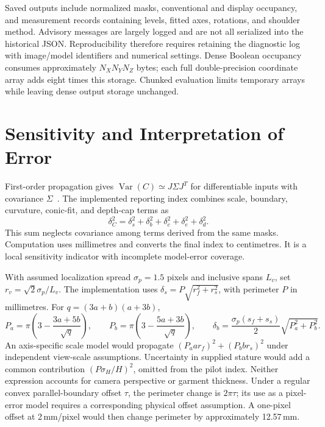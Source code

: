\documentclass[11pt,a4paper]{article}
\begin{document}
Saved outputs include normalized masks, conventional and display occupancy, and measurement records containing levels, fitted axes, rotations, and shoulder method. Advisory messages are largely logged and are not all serialized into the historical JSON. Reproducibility therefore requires retaining the diagnostic log with image/model identifiers and numerical settings. Dense Boolean occupancy consumes approximately $N_XN_YN_Z$ bytes; each full double-precision coordinate array adds eight times this storage. Chunked evaluation limits temporary arrays while leaving dense output storage unchanged.

\section{Sensitivity and Interpretation of Error}
First-order propagation gives $\operatorname{Var}(C)\simeq J\Sigma J^T$ for differentiable inputs with covariance $\Sigma$~\cite{jcgm2008}. The implemented reporting index combines scale, boundary, curvature, conic-fit, and depth-cap terms as
\begin{equation}
 \delta_C^2=\delta_s^2+\delta_b^2+\delta_c^2+\delta_e^2+\delta_d^2.
 \label{eq:rss}
\end{equation}
This sum neglects covariance among terms derived from the same masks. Computation uses millimetres and converts the final index to centimetres. It is a local sensitivity indicator with incomplete model-error coverage.

With assumed localization spread $\sigma_p=1.5$ pixels and inclusive spans $L_v$, set $r_v=\sqrt2\sigma_p/L_v$. The implementation uses $\delta_s=P\sqrt{r_f^2+r_s^2}$, with perimeter $P$ in millimetres. For $q=(3a+b)(a+3b)$,
\begin{equation}
 P_a=\pi\!\left(3-\frac{3a+5b}{\sqrt q}\right),\qquad
 P_b=\pi\!\left(3-\frac{5a+3b}{\sqrt q}\right),\qquad
 \delta_b=\frac{\sigma_p(s_f+s_s)}2\sqrt{P_a^2+P_b^2}.
 \label{eq:derivative}
\end{equation}
An axis-specific scale model would propagate $(P_aa r_f)^2+(P_bb r_s)^2$ under independent view-scale assumptions. Uncertainty in supplied stature would add a common contribution $(P\sigma_H/H)^2$, omitted from the pilot index. Neither expression accounts for camera perspective or garment thickness. Under a regular convex parallel-boundary offset $\tau$, the perimeter change is $2\pi\tau$; its use as a pixel-error model requires a corresponding physical offset assumption. A one-pixel offset at 2\,mm/pixel would then change perimeter by approximately 12.57\,mm.
\end{document}
